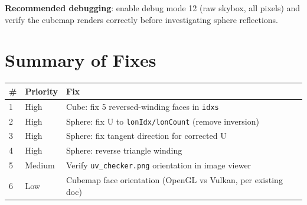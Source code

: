 \documentclass{article}
\begin{document}
\textbf{Recommended debugging}: enable debug mode 12 (raw skybox, all pixels)
and verify the cubemap renders correctly before investigating sphere reflections.

\section{Summary of Fixes}

\begin{table}[h]
\centering
\begin{tabular}{llp{5cm}}
\toprule
\textbf{\#} & \textbf{Priority} & \textbf{Fix} \\
\midrule
1 & High & Cube: fix 5 reversed-winding faces in \texttt{idxs} \\
2 & High & Sphere: fix U to \texttt{lonIdx/lonCount} (remove inversion) \\
3 & High & Sphere: fix tangent direction for corrected U \\
4 & High & Sphere: reverse triangle winding \\
5 & Medium & Verify \texttt{uv\_checker.png} orientation in image viewer \\
6 & Low & Cubemap face orientation (OpenGL vs Vulkan, per existing doc) \\
\bottomrule
\end{tabular}
\end{table}
\end{document}
